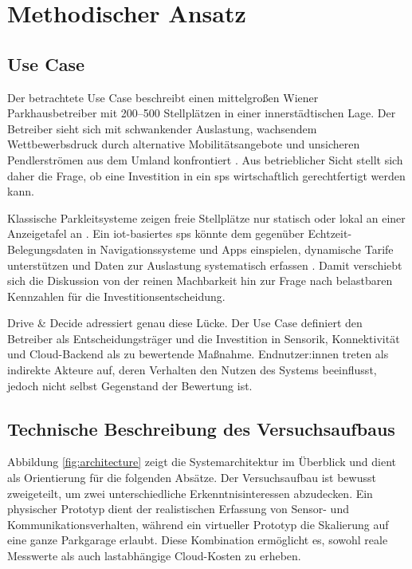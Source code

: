 \section{Methodischer Ansatz}\label{sec:methodology}

\subsection{Use Case}

Der betrachtete Use Case beschreibt einen mittelgroßen Wiener Parkhausbetreiber mit \mbox{200--500} Stellplätzen in einer innerstädtischen Lage. Der Betreiber sieht sich mit schwankender Auslastung, wachsendem Wettbewerbsdruck durch alternative Mobilitätsangebote und unsicheren Pendlerströmen aus dem Umland konfrontiert \citep{wangEconomicsSmartParking2025}. Aus betrieblicher Sicht stellt sich daher die Frage, ob eine Investition in ein \ac{sps} wirtschaftlich gerechtfertigt werden kann.

Klassische Parkleitsysteme zeigen freie Stellplätze nur statisch oder lokal an einer Anzeigetafel an \citep{stadtwienParkleitsystemFuerWien2026}. Ein \ac{iot}-basiertes \ac{sps} könnte dem gegenüber Echtzeit-Belegungsdaten in Navigationssysteme und Apps einspielen, dynamische Tarife unterstützen und Daten zur Auslastung systematisch erfassen \citep{sarkerSmartParkingSystem2020}. Damit verschiebt sich die Diskussion von der reinen Machbarkeit hin zur Frage nach belastbaren Kennzahlen für die Investitionsentscheidung.

Drive \& Decide adressiert genau diese Lücke. Der Use Case definiert den Betreiber als Entscheidungsträger und die Investition in Sensorik, Konnektivität und Cloud-Backend als zu bewertende Maßnahme. Endnutzer:innen treten als indirekte Akteure auf, deren Verhalten den Nutzen des Systems beeinflusst, jedoch nicht selbst Gegenstand der Bewertung ist.

\subsection{Technische Beschreibung des Versuchsaufbaus}

Abbildung \ref{fig:architecture} zeigt die Systemarchitektur im Überblick und dient als Orientierung für die folgenden Absätze. Der Versuchsaufbau ist bewusst zweigeteilt, um zwei unterschiedliche Erkenntnisinteressen abzudecken. Ein physischer Prototyp dient der realistischen Erfassung von Sensor- und Kommunikationsverhalten, während ein virtueller Prototyp die Skalierung auf eine ganze Parkgarage erlaubt. Diese Kombination ermöglicht es, sowohl reale Messwerte als auch lastabhängige Cloud-Kosten zu erheben.

